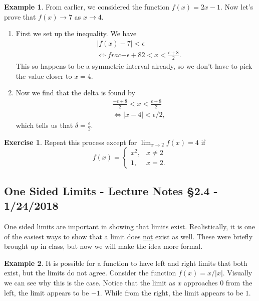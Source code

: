 \documentclass[leqno]{article}
\theoremstyle{definition}
\newtheorem{example}{Example}[section]
\newtheorem{exercise}{Exercise}[section]
\theoremstyle{remark}
\theoremstyle{theorem}
\begin{document}
\begin{example}
From earlier, we considered the function $f(x)=2x-1$.  Now let's prove that $f(x)\to 7$ as $x\to 4$. 
\begin{enumerate}[1.]
\item First we set up the inequality.  We have
\begin{align*}
&|f(x)-7|<\epsilon\\
&\iff frac{-\epsilon+8}{2}<x<\frac{\epsilon+8}{2}.
\end{align*}
This so happens to be a symmetric interval already, so we don't have to pick the value closer to $x=4$.  
\item Now we find that the delta is found by 
\begin{align*}
&\frac{-\epsilon+8}{2}<x<\frac{\epsilon+8}{2}\\
&\iff |x-4|<\epsilon/2,
\end{align*}
which tells us that $\delta=\frac{\epsilon}{2}$.
\end{enumerate}
\end{example}

\begin{exercise}
Repeat this process except for $\lim_{x\to 2} f(x)=4$ if
\[
f(x)= 
\begin{cases}
x^2, & x\neq 2\\
1, & x=2.
\end{cases}
\]
\vspace*{8cm}
\end{exercise}

\subsection{One Sided Limits - Lecture Notes \S 2.4 - 1/24/2018}

One sided limits are important in showing that limits exist.  Realistically, it is one of the easiest ways to show that a limit does \underline{not} exist as well.  These were briefly brought up in class, but now we will make the idea more formal. 

\begin{example}
It is possible for a function to have left and right limits that both exist, but the limits do not agree.  Consider the function $f(x)=x/|x|$.  Visually we can see why this is the case.
\vspace*{5cm}
Notice that the limit as $x$ approaches $0$ from the left, the limit appears to be $-1$. While from the right, the limit appears to be $1$.  
\end{example}
\end{document}
